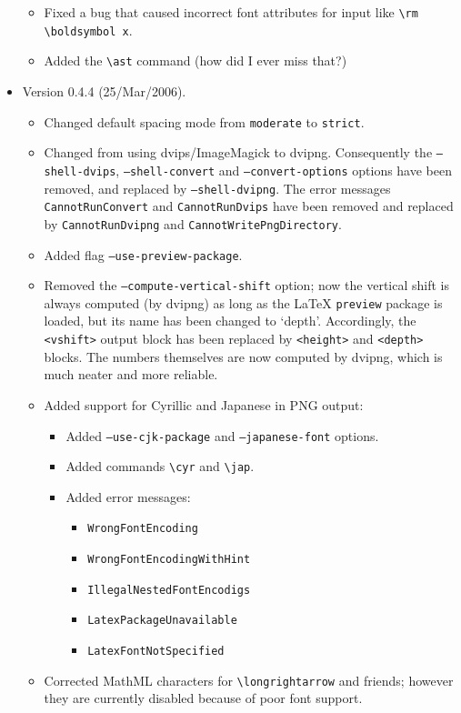 \documentclass{article}
\newcommand{\texcommand}[1]{\textbackslash{}#1}
\begin{document}
\begin{itemize}
\begin{itemize}
\item Fixed a bug that caused incorrect font attributes for input like \texttt{\texcommand{rm} \texcommand{boldsymbol} x}.
\item Added the \texttt{\texcommand{ast}} command (how did I ever miss that?)
\end{itemize}
\item Version 0.4.4 (25/Mar/2006).
\begin{itemize}
\item Changed default spacing mode from \texttt{moderate} to \texttt{strict}.
\item Changed from using dvips/ImageMagick to dvipng. Consequently the \texttt{--shell-dvips}, \texttt{--shell-convert} and \texttt{--convert-options} options have been removed, and replaced by \texttt{--shell-dvipng}. The error messages \texttt{CannotRunConvert} and \texttt{CannotRunDvips} have been removed and replaced by \texttt{CannotRunDvipng} and \texttt{CannotWritePngDirectory}.
\item Added flag \texttt{--use-preview-package}.
\item Removed the \texttt{--compute-vertical-shift} option; now the vertical shift is always computed (by dvipng) as long as the \LaTeX{} \texttt{preview} package is loaded, but its name has been changed to `depth'. Accordingly, the \texttt{<vshift>} output block has been replaced by \texttt{<height>} and \texttt{<depth>} blocks. The numbers themselves are now computed by dvipng, which is much neater and more reliable.
\item Added support for Cyrillic and Japanese in PNG output:
\begin{itemize}
\item Added \texttt{--use-cjk-package} and \texttt{--japanese-font} options.
\item Added commands \texttt{\texcommand{cyr}} and \texttt{\texcommand{jap}}.
\item Added error messages:
\begin{itemize}
\item \texttt{WrongFontEncoding}
\item \texttt{WrongFontEncodingWithHint}
\item \texttt{IllegalNestedFontEncodigs}
\item \texttt{LatexPackageUnavailable}
\item \texttt{LatexFontNotSpecified}
\end{itemize}
\end{itemize}
\item Corrected MathML characters for \texttt{\texcommand{longrightarrow}} and friends; however they are currently disabled because of poor font support.

\end{itemize}
\end{itemize}
\end{document}
